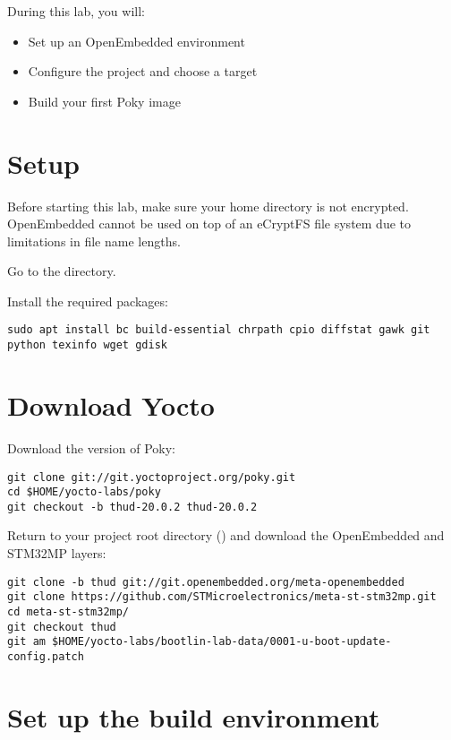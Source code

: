 
During this lab, you will:
\begin{itemize}
  \item Set up an OpenEmbedded environment
  \item Configure the project and choose a target
  \item Build your first Poky image
\end{itemize}

\section{Setup}

Before starting this lab, make sure your home directory is not
encrypted. OpenEmbedded cannot be used on top of an eCryptFS file
system due to limitations in file name lengths.

Go to the  directory.

Install the required packages:
\begin{verbatim}
sudo apt install bc build-essential chrpath cpio diffstat gawk git python texinfo wget gdisk
\end{verbatim}

\section{Download Yocto}

Download the  version of Poky:
\begin{verbatim}
git clone git://git.yoctoproject.org/poky.git
cd $HOME/yocto-labs/poky
git checkout -b thud-20.0.2 thud-20.0.2
\end{verbatim}

Return to your project root directory ()
and download the OpenEmbedded and STM32MP layers:
\begin{verbatim}
git clone -b thud git://git.openembedded.org/meta-openembedded
git clone https://github.com/STMicroelectronics/meta-st-stm32mp.git
cd meta-st-stm32mp/
git checkout thud
git am $HOME/yocto-labs/bootlin-lab-data/0001-u-boot-update-config.patch
\end{verbatim}

\section{Set up the build environment}

